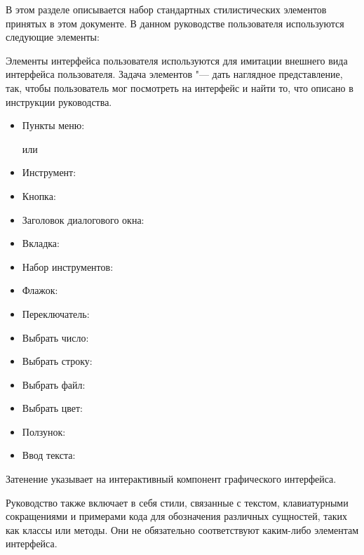 \label{label_conventions}

В этом разделе описывается набор стандартных стилистических элементов
принятых в этом документе. В данном руководстве пользователя
используются следующие элементы:


Элементы интерфейса пользователя используются для имитации внешнего
вида интерфейса пользователя. Задача элементов "--- дать наглядное
представление, так, чтобы пользователь мог посмотреть на интерфейс и
найти то, что описано в инструкции руководства.

\begin{itemize}[label=--,itemsep=5pt]
\item Пункты меню:  \arrow
{}

или

 \arrow
{} \arrow {}
\item Инструмент: 
\item Кнопка: 
\item Заголовок диалогового окна: 
\item Вкладка: 
\item Набор инструментов: 
\item Флажок: 
\item Переключатель:  
\item Выбрать число: 
\item Выбрать строку: 
\item Выбрать файл: \browsebutton
\item Выбрать цвет: 
\item Ползунок: 
\item Ввод текста: 
\end{itemize}
Затенение указывает на интерактивный компонент графического интерфейса.


Руководство также включает в себя стили, связанные с текстом,
клавиатурными сокращениями и примерами кода для обозначения различных
сущностей, таких как классы или методы. Они не обязательно соответствуют
каким-либо элементам интерфейса.

